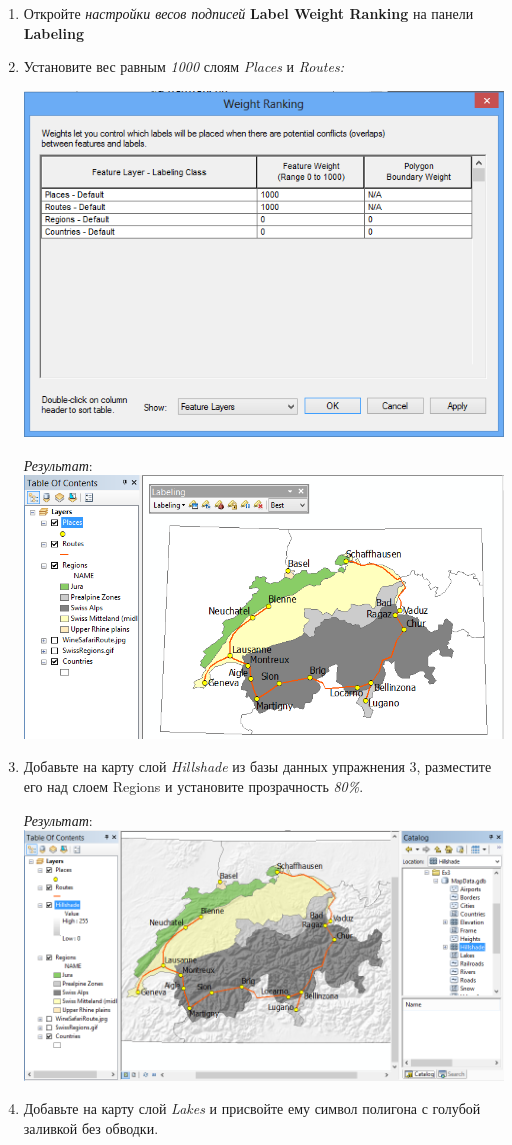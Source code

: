 \documentclass[]{book}
\theoremstyle{definition}
\theoremstyle{definition}
\theoremstyle{definition}
\theoremstyle{remark}
\begin{document}
\begin{enumerate}
\def\labelenumi{\arabic{enumi}.}
\item
  Откройте \emph{настройки весов подписей} \textbf{Label Weight Ranking}
  на панели \textbf{Labeling}
\item
  Установите вес равным \emph{1000} слоям \emph{Places} и \emph{Routes:}

  \includegraphics{images/Ex05/image33.png}

  \emph{Результат}: \includegraphics{images/Ex05/image34.png}
\item
  Добавьте на карту слой \emph{Hillshade} из базы данных упражнения 3,
  разместите его над слоем Regions и установите прозрачность
  \emph{80\%}.

  \emph{Результат}: \includegraphics{images/Ex05/image35.png}
\item
  Добавьте на карту слой \emph{Lakes} и присвойте ему символ полигона с
  голубой заливкой без обводки.


\end{enumerate}
\end{document}
